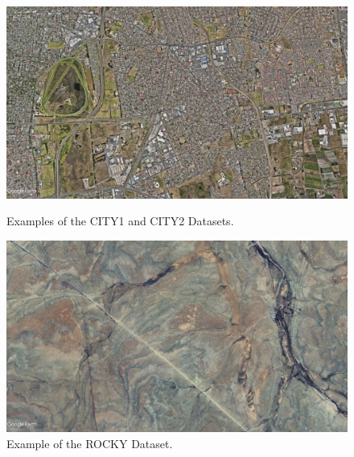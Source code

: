 \begin{figure}[H]
    \centering
    \begin{minipage}{0.45\textwidth}
        \centering
        \includegraphics[width=\textwidth]{./Chapter 4/DEMODATASETS/CITY1.jpg}
        \caption{Examples of the CITY1 and CITY2 Datasets.}
        \label{fig:CITY12}
    \end{minipage}\hfill
    \begin{minipage}{0.45\textwidth}
        \centering
        \includegraphics[width=\textwidth]{./Chapter 4/DEMODATASETS/ROCKY.jpg}
        \caption{Example of the ROCKY Dataset.}
        \label{fig:ROCKY}
    \end{minipage}
    
    \vspace{0.5cm} %
    

\end{figure}
